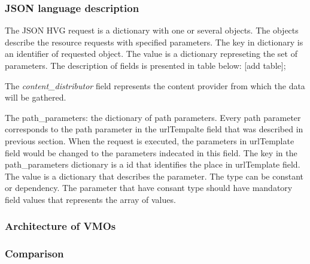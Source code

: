 \subsubsection{JSON language description}

The JSON HVG request is a dictionary with one or several objects. The objects describe the resource requests with specified parameters. The key in dictionary is an identifier of requested object. The value is a dictionary represeting the set of parameters. 
The description of fields is presented in table below: [add table];

The \textit{content\_distributor} field represents the content provider from which the data will be gathered.

The path\_parameters: the dictionary of path parameters. Every path parameter corresponds to the path parameter in the urlTempalte field that was described in previous section. When the request is executed, the parameters in urlTemplate field would be changed to the parameters indecated in this field. 
The key in the path\_parameters dictionary is a id that identifies the place in urlTemplate field.
The value is a dictionary that describes the parameter. 
The type can be constant or dependency. The parameter that have consant type should have mandatory field values that represents the array of values. 

\subsubsection{Architecture of VMOs}



\subsubsection{Comparison}


